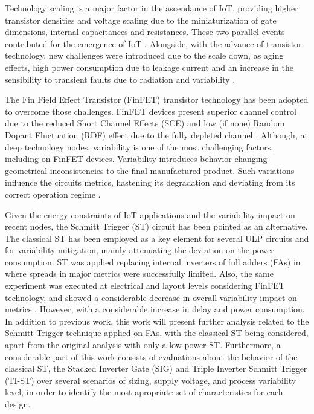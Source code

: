 \documentclass[pgmicro,mestrado,english]{iiufrgs}
\begin{document}
    Technology scaling is a major factor in the ascendance of IoT, providing higher transistor densities and voltage scaling due to the miniaturization of gate dimensions, internal capacitances and resistances. These two parallel events contributed for the emergence of IoT \cite{islam:10}. Alongside, with the advance of transistor technology, new challenges were introduced due to the scale down, as aging effects, high power consumption due to leakage current and an increase in the sensibility to transient faults due to radiation and variability \cite{abbas:15}.

    The Fin Field Effect Transistor (FinFET) transistor technology has been adopted to overcome those challenges. FinFET devices present superior channel control due to the reduced Short Channel Effects (SCE) and low (if none) Random Dopant Fluctuation (RDF) effect due to the fully depleted channel \cite{farkhani2014comparative}. Although, at deep technology nodes, variability is one of the most challenging factors, including on FinFET devices. Variability introduces behavior changing geometrical inconsistencies to the final manufactured product. Such variations influence the circuits metrics, hastening its degradation and deviating from its correct operation regime \cite{abbas:15} \cite{nassif:08}.

    Given the energy constraints of IoT applications and the variability impact on recent nodes, the Schmitt Trigger (ST) circuit has been pointed as an alternative. The classical ST has been employed as a key element for several ULP circuits \cite{kulkarni2007160, hays201262, melek:17, lotze2017ultra} and for variability mitigation, mainly attenuating the deviation on the power consumption. ST was applied replacing internal inverters of full adders (FAs) in \cite{dokania2015circuit} where spreads in major metrics were successfully limited. Also, the same experiment was executed at electrical and layout levels considering FinFET technology, and showed a considerable decrease in overall variability impact on metrics \cite{toledo2018pros,moraes2018evaluation}. However, with a considerable increase in delay and power consumption. In addition to previous work, this work will present further analysis related to the Schmitt Trigger technique applied on FAs, with the classical ST being considered, apart from the original analysis with only a low power ST. Furthermore, a considerable part of this work consists of evaluations about the behavior of the classical ST, the Stacked Inverter Gate (SIG) \cite{bose2018stacked} and Triple Inverter Schmitt Trigger (TI-ST) \cite{luo2017sub} over several scenarios of sizing, supply voltage, and process variability level, in order to identify the most apropriate set of characteristics for each design.
\end{document}
